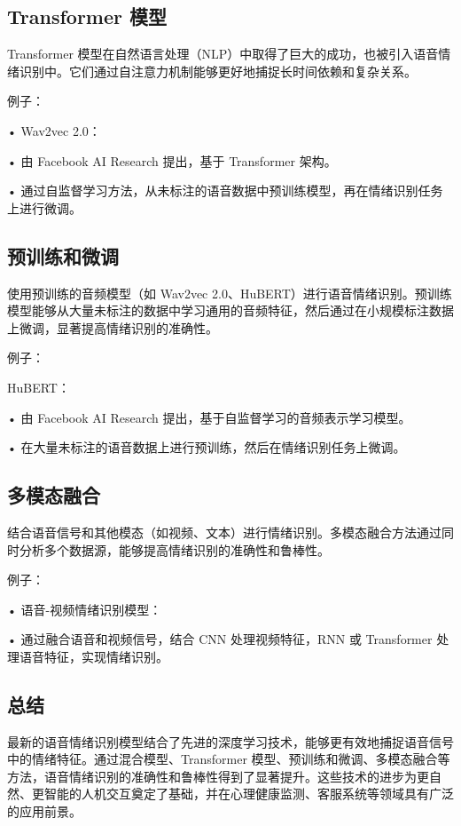 \documentclass[lang=cn,newtx,12pt,scheme=chinese]{elegantbook}
\begin{document}
\subsection{Transformer 模型}

Transformer 模型在自然语言处理（NLP）中取得了巨大的成功，也被引入语音情绪识别中。它们通过自注意力机制能够更好地捕捉长时间依赖和复杂关系。

例子：

	•	Wav2vec 2.0：
	
	•	由 Facebook AI Research 提出，基于 Transformer 架构。
	
	•	通过自监督学习方法，从未标注的语音数据中预训练模型，再在情绪识别任务上进行微调。


\subsection{预训练和微调}

使用预训练的音频模型（如 Wav2vec 2.0、HuBERT）进行语音情绪识别。预训练模型能够从大量未标注的数据中学习通用的音频特征，然后通过在小规模标注数据上微调，显著提高情绪识别的准确性。

例子：

HuBERT：

	•	由 Facebook AI Research 提出，基于自监督学习的音频表示学习模型。
	
	•	在大量未标注的语音数据上进行预训练，然后在情绪识别任务上微调。
	
\subsection{多模态融合}

结合语音信号和其他模态（如视频、文本）进行情绪识别。多模态融合方法通过同时分析多个数据源，能够提高情绪识别的准确性和鲁棒性。

例子：

	•	语音-视频情绪识别模型：
	
	•	通过融合语音和视频信号，结合 CNN 处理视频特征，RNN 或 Transformer 处理语音特征，实现情绪识别。
	
\subsection{总结}

最新的语音情绪识别模型结合了先进的深度学习技术，能够更有效地捕捉语音信号中的情绪特征。通过混合模型、Transformer 模型、预训练和微调、多模态融合等方法，语音情绪识别的准确性和鲁棒性得到了显著提升。这些技术的进步为更自然、更智能的人机交互奠定了基础，并在心理健康监测、客服系统等领域具有广泛的应用前景。
\end{document}
